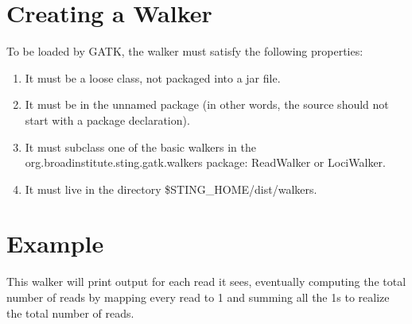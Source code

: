 \documentclass[11pt,fullpage]{article}
\begin{document}
\section{Creating a Walker}
To be loaded by GATK, the walker must satisfy the following properties:
\begin{enumerate}
  \item It must be a loose class, not packaged into a jar file.
  \item It must be in the unnamed package (in other words, the source
    should not start with a package declaration).
  \item It must subclass one of the basic walkers in the 
    org.broadinstitute.sting.gatk.walkers package: ReadWalker or 
    LociWalker.
  \item It must live in the directory \$STING\_HOME/dist/walkers.
\end{enumerate}

\section{Example}
This walker will print output for each read it sees, eventually computing the
total number of reads by mapping every read to 1 and summing all the 1s to
realize the total number of reads.
\end{document}
